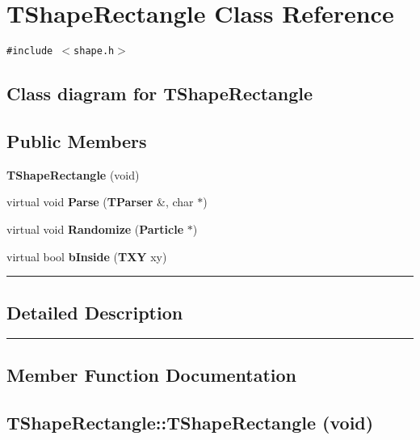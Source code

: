 \section{TShapeRectangle  Class Reference}
\label{TShapeRectangle}


{\tt \#include $<$shape.h$>$}

\subsection*{Class diagram for TShapeRectangle}
\begin{figure}[H]
\begin{center}
\leavevmode
\setlength{\epsfysize}{2cm}
\end{center}
\end{figure}
\subsection*{Public Members}
\begin{CompactItemize}
\item 
{\bf TShape\-Rectangle} (void)
\item 
virtual void {\bf Parse} ({\bf TParser} \&, char $\ast$)
\item 
virtual void {\bf Randomize} ({\bf Particle} $\ast$)
\item 
virtual bool {\bf b\-Inside} ({\bf TXY} xy)
\end{CompactItemize}
\vspace{0.4cm}\hrule\vspace{0.2cm}
\subsection*{Detailed Description}
\vspace{0.4cm}\hrule\vspace{0.2cm}
\subsection*{Member Function Documentation}
\label{TShapeRectangle_a0}
\subsection{\setlength{\rightskip}{0pt plus 5cm}TShape\-Rectangle::TShape\-Rectangle (void)}

